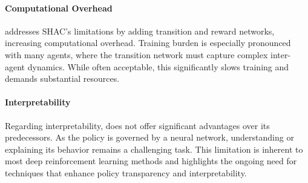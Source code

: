 \paragraph{Computational Overhead}
\fname{} addresses SHAC's limitations by adding transition and reward networks, increasing computational overhead. Training burden is especially pronounced with many agents, where the transition network must capture complex inter-agent dynamics. While often acceptable, this significantly slows training and demands substantial resources.

\paragraph{Interpretability}
Regarding interpretability, \fname{} does not offer significant advantages over its predecessors. As the policy is governed by a neural network, understanding or explaining its behavior remains a challenging task. This limitation is inherent to most deep reinforcement learning methods and highlights the ongoing need for techniques that enhance policy transparency and interpretability.

